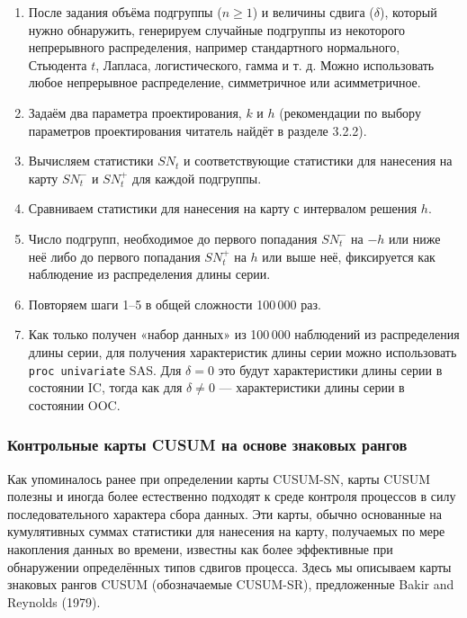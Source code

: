 \begin{enumerate}
	\item[\textbf{Шаг 1:}] После задания объёма подгруппы (\(n \ge 1\)) и величины сдвига (\(\delta\)), который нужно обнаружить, генерируем случайные подгруппы из некоторого непрерывного распределения, например стандартного нормального, Стьюдента \(t\), Лапласа, логистического, гамма и т. д. Можно использовать любое непрерывное распределение, симметричное или асимметричное.
	\item[\textbf{Шаг 2:}] Задаём два параметра проектирования, \(k\) и \(h\) (рекомендации по выбору параметров проектирования читатель найдёт в разделе 3.2.2).
	\item[\textbf{Шаг 3:}] Вычисляем статистики \(SN_t\) и соответствующие статистики для нанесения на карту \(SN_t^-\) и \(SN_t^+\) для каждой подгруппы.
	\item[\textbf{Шаг 4:}] Сравниваем статистики для нанесения на карту с интервалом решения \(h\).
	\item[\textbf{Шаг 5:}] Число подгрупп, необходимое до первого попадания \(SN_t^-\) на \(-h\) или ниже неё либо до первого попадания \(SN_t^+\) на \(h\) или выше неё, фиксируется как наблюдение из распределения длины серии.
	\item[\textbf{Шаг 6:}] Повторяем шаги 1--5 в общей сложности 100\,000 раз.
	\item[\textbf{Шаг 7:}] Как только получен «набор данных» из 100\,000 наблюдений из распределения длины серии, для получения характеристик длины серии можно использовать \texttt{proc univariate} SAS. Для \(\delta = 0\) это будут характеристики длины серии в состоянии IC, тогда как для \(\delta \ne 0\) --- характеристики длины серии в состоянии OOC.
\end{enumerate}

\subsubsection{Контрольные карты CUSUM на основе знаковых рангов}
Как упоминалось ранее при определении карты CUSUM-SN, карты CUSUM полезны и иногда более естественно подходят к среде контроля процессов в силу последовательного характера сбора данных. Эти карты, обычно основанные на кумулятивных суммах статистики для нанесения на карту, получаемых по мере накопления данных во времени, известны как более эффективные при обнаружении определённых типов сдвигов процесса. Здесь мы описываем карты знаковых рангов CUSUM (обозначаемые CUSUM-SR), предложенные Bakir and Reynolds (1979).


